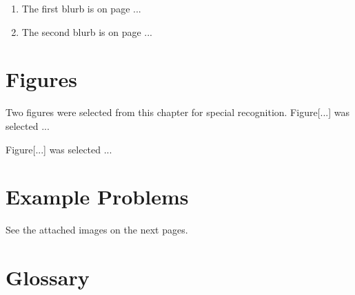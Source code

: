 \documentclass[12pt]{article}
\begin{document}
\begin{enumerate}
  \item The first blurb is on page ...

  \item The second blurb is on page ...
\end{enumerate}

\section{Figures}

Two figures were selected from this chapter for special recognition. Figure[...] was selected ...


Figure[...] was selected ...


\section{Example Problems}

See the attached images on the next pages.

% 

\section{Glossary}
\end{document}
